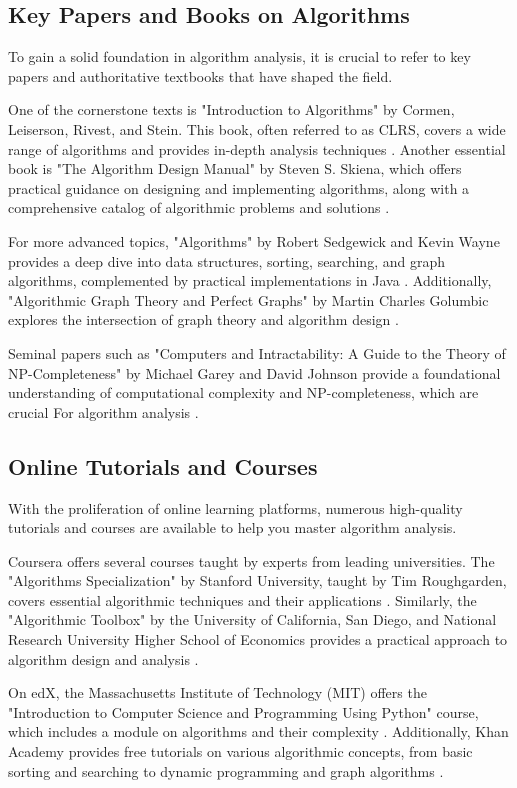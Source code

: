 \documentclass[12pt]{book} %
\begin{document}
\subsection{Key Papers and Books on Algorithms}
To gain a solid foundation in algorithm analysis, it is crucial to refer to key papers and authoritative textbooks that have shaped the field. 

One of the cornerstone texts is "Introduction to Algorithms" by Cormen, Leiserson, Rivest, and Stein. This book, often referred to as CLRS, covers a wide range of algorithms and provides in-depth analysis techniques . Another essential book is "The Algorithm Design Manual" by Steven S. Skiena, which offers practical guidance on designing and implementing algorithms, along with a comprehensive catalog of algorithmic problems and solutions .

For more advanced topics, "Algorithms" by Robert Sedgewick and Kevin Wayne provides a deep dive into data structures, sorting, searching, and graph algorithms, complemented by practical implementations in Java . Additionally, "Algorithmic Graph Theory and Perfect Graphs" by Martin Charles Golumbic explores the intersection of graph theory and algorithm design .

Seminal papers such as "Computers and Intractability: A Guide to the Theory of NP-Completeness" by Michael Garey and David Johnson provide a foundational understanding of computational complexity and NP-completeness, which are crucial For algorithm analysis .

\subsection{Online Tutorials and Courses}
With the proliferation of online learning platforms, numerous high-quality tutorials and courses are available to help you master algorithm analysis. 

Coursera offers several courses taught by experts from leading universities. The "Algorithms Specialization" by Stanford University, taught by Tim Roughgarden, covers essential algorithmic techniques and their applications . Similarly, the "Algorithmic Toolbox" by the University of California, San Diego, and National Research University Higher School of Economics provides a practical approach to algorithm design and analysis .

On edX, the Massachusetts Institute of Technology (MIT) offers the "Introduction to Computer Science and Programming Using Python" course, which includes a module on algorithms and their complexity . Additionally, Khan Academy provides free tutorials on various algorithmic concepts, from basic sorting and searching to dynamic programming and graph algorithms .
\end{document}
